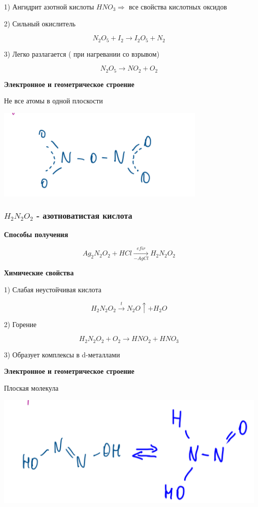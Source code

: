 \documentclass[14pt,a4paper]{scrartcl}
\begin{document}
1) Ангидрит азотной кислоты $HNO_3 \Rightarrow$ все свойства кислотных оксидов

2) Сильный окислитель

$$N_2O_5 + I_2 \rightarrow I_2O_5 + N_2$$

3) Легко разлагается ( при нагревании со взрывом)

$$N_2O_5 \rightarrow NO_2 + O_2$$

\textbf{Электронное и геометрическое строение}

Не все атомы в одной плоскости

\includegraphics{8v11.png}

\subsubsection{$H_2N_2O_2$ - азотноватистая кислота}

\textbf{Способы получения}

$$Ag_2N_2O_2 + HCl \xrightarrow[-AgCl]{efir} H_2N_2O_2$$

\textbf{Химические свойства}

1) Слабая неустойчивая кислота

$$H_2N_2O_2 \xrightarrow{t} N_2O \uparrow + H_2O$$

2) Горение

$$H_2N_2O_2 +O_2 \rightarrow HNO_2 + HNO_3$$

3) Образует комплексы в d-металлами

\textbf{Электронное и геометрическое строение}

Плоская молекула

\includegraphics{8v12.png}
\end{document}
